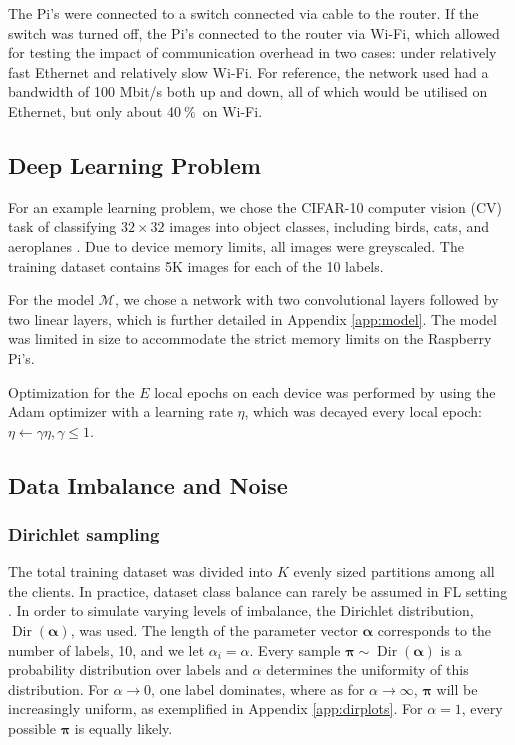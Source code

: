 \documentclass{article}
\newcommand{\unit}[1]{\ensuremath{\:\text{#1}}}
\newcommand{\pro}{\ensuremath{\unit{\%{}}}}
\begin{document}
The Pi's were connected to a switch connected via cable to the router.
If the switch was turned off, the Pi's connected to the router via Wi-Fi, which allowed for testing the impact of communication overhead in two cases: under relatively fast Ethernet and relatively slow Wi-Fi.
For reference, the network used had a bandwidth of 100 Mbit/s both up and down, all of which would be utilised on Ethernet, but only about 40\pro\ on Wi-Fi.

\subsection{Deep Learning Problem}
For an example learning problem, we chose the CIFAR-10 computer vision (CV) task of classifying $32\times 32$ images into object classes, including birds, cats, and aeroplanes \cite{alex2009learning}.
Due to device memory limits, all images were greyscaled.
The training dataset contains 5K images for each of the 10 labels.

For the model $\mathcal M$, we chose a network with two convolutional layers followed by two linear layers, which is further detailed in Appendix \ref{app:model}.
The model was limited in size to accommodate the strict memory limits on the Raspberry Pi's.

Optimization for the $E$ local epochs on each device was performed by using the Adam optimizer \cite{kingma2015adam} with a learning rate $\eta$, which was decayed every local epoch: $\eta\leftarrow\gamma\eta, \gamma\le 1$.

\subsection{Data Imbalance and Noise}
\subsubsection{Dirichlet sampling}
The total training dataset was divided into $K$ evenly sized partitions among all the clients.
In practice, dataset class balance can rarely be assumed in FL setting \cite{kai2021advances}.
In order to simulate varying levels of imbalance, the Dirichlet distribution, $\operatorname{Dir}(\bm\alpha)$, was used.
The length of the parameter vector  $\bm\alpha$ corresponds to the number of labels, 10, and we let $\alpha_i=\alpha$.
Every sample $\bm\pi\sim\operatorname{Dir}(\bm\alpha)$ is a probability distribution over labels and $\alpha$ determines the uniformity of this distribution.
For $\alpha\to0$, one label dominates, where as for $\alpha\to\infty$, $\bm\pi$ will be increasingly uniform, as exemplified in Appendix \ref{app:dirplots}.
For $\alpha=1$, every possible $\bm\pi$ is equally likely.
\end{document}
